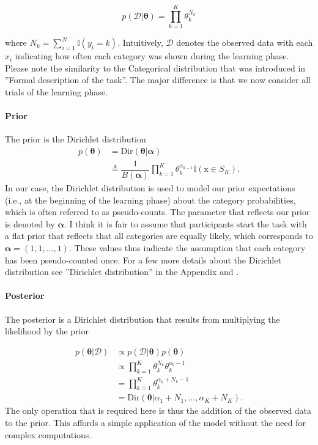 \documentclass[a4paper,12pt]{article} 			%
\begin{document}
\begin{equation}
p(\boldsymbol{\mathcal{D}}|\boldsymbol{\theta})= \prod^K_{k=1}\theta^{N_k}_k 
\end{equation}

where $N_k = \sum_{i=1}^{N}\mathbb{I}(y_i=k)$. Intuitively, $\boldsymbol{\mathcal{D}}$ denotes the observed data with each $x_i$ indicating how often each category was shown during the learning phase. Please note the similarity to the Categorical distribution that was introduced in ''Formal description of the task''. The major difference is that we now consider all trials of the learning phase.

\paragraph{Prior}
The prior is the Dirichlet distribution
\begin{equation}
\begin{aligned}
p(\boldsymbol{\theta}) & = \mathrm{Dir}(\boldsymbol{\theta}|\boldsymbol{\alpha})\\
&\triangleq \dfrac{1}{B(\boldsymbol{\alpha})} \prod^K_{k=1}\theta_k^{\alpha_{k-1}}\mathbb{I}(\mathrm{x}\in S_K).	
\end{aligned}
\end{equation}
In our case, the Dirichlet distribution is used to model our prior expectations (i.e., at the beginning of the learning phase) about the category probabilities, which is often referred to as pseudo-counts. The parameter that reflects our prior is denoted by $\boldsymbol{\alpha}$. I think it is fair to assume that participants start the task with a flat prior that reflects that all categories are equally likely, which corresponds to $\boldsymbol{\alpha} = (1,1,...,1)$. These values thus indicate the assumption that each category has been pseudo-counted once. For a few more details about the Dirichlet distribution see ''Dirichlet distribution'' in the Appendix and \cite{Murphy2012}.

\paragraph{Posterior}
The posterior is a Dirichlet distribution that results from multiplying the likelihood by the prior

\begin{equation}
\begin{aligned}
p(\boldsymbol{\theta}|\boldsymbol{\mathcal{D}})
&\propto p(\boldsymbol{\mathcal{D}}|\boldsymbol{\theta})p(\boldsymbol{\theta})\\
&\propto \prod^K_{k=1} \theta^{N_k}_k \theta_k^{a_{k}-1} \\
&= \prod^K_{k=1} \theta^{\alpha_k+N_{k}-1}_k \\ 
&= \mathrm{Dir}(\boldsymbol{\theta}|\alpha_1 + N_1,...,\alpha_K + N_K).
\end{aligned}
\end{equation}
The only operation that is required here is thus the addition of the observed data to the prior. This affords a simple application of the model without the need for complex computations.
\end{document}
